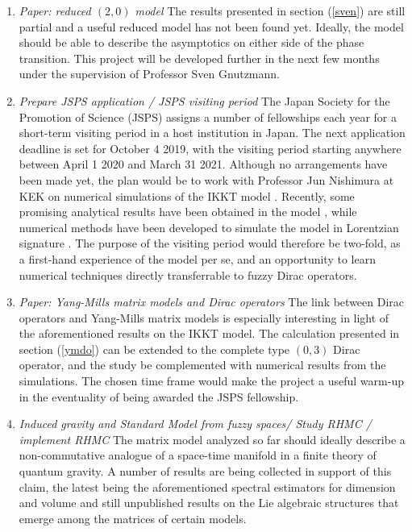 \begin{enumerate}
\item \textit{Paper: reduced $(2,0)$ model}\newline
The results presented in section (\ref{sven}) are still partial and a useful reduced model has not been found yet. Ideally, the model should be able to describe the asymptotics on either side of the phase transition. This project will be developed further in the next few months under the supervision of Professor Sven Gnutzmann.
\item \textit{Prepare JSPS application / JSPS visiting period}\newline
The Japan Society for the Promotion of Science (JSPS) assigns a number of fellowships each year for a short-term visiting period in a host institution in Japan. The next application deadline is set for October 4 2019, with the visiting period starting anywhere between April 1 2020 and March 31 2021. Although no arrangements have been made yet, the plan would be to work with Professor Jun Nishimura at KEK on numerical simulations of the IKKT model \cite{ikkt}. Recently, some promising analytical results have been obtained in the model \cite{haroldCOSM}, while numerical methods have been developed to simulate the model in Lorentzian signature \cite{nishi}. The purpose of the visiting period would therefore be two-fold, as a first-hand experience of the model per se, and an opportunity to learn numerical techniques directly transferrable to fuzzy Dirac operators. 
\item \textit{Paper: Yang-Mills matrix models and Dirac operators}\newline
The link between Dirac operators and Yang-Mills matrix models is especially interesting in light of the aforementioned results on the IKKT model. The calculation presented in section (\ref{ymdo}) can be extended to the complete type $(0,3)$ Dirac operator, and the study be complemented with numerical results from the simulations. The chosen time frame would make the project a useful warm-up in the eventuality of being awarded the JSPS fellowship. 
\item \textit{Induced gravity and Standard Model from fuzzy spaces/ Study RHMC / implement RHMC}\newline
The matrix model analyzed so far should ideally describe a non-commutative analogue of a space-time manifold in a finite theory of quantum gravity. A number of results are being collected in support of this claim, the latest being the aforementioned spectral estimators for dimension and volume \cite{barrdruceglaser} and still unpublished results on the Lie algebraic structures that emerge among the matrices of certain models.\newline

\end{enumerate}
